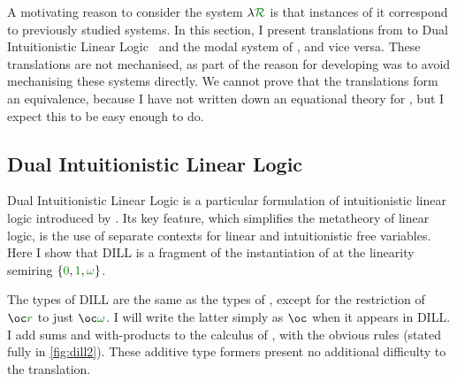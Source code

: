 \newcommand\instDILL{\gr{01\omega}}
\newcommand\instPD{\gr{01\Box}}

\newcommand\unused{\gr0}
\newcommand\true{\gr1}
\newcommand\valid{\gr\Box}

A motivating reason to consider the system $\name$ is that
instances of it correspond to previously studied systems.
In this section, I present translations from \name{} to Dual Intuitionistic
Linear Logic~\citep{Barber1996} and the modal system of \citet{judgmental},
and vice versa.
These translations are not mechanised, as part of the reason for developing
\name{} was to avoid mechanising these systems directly.
We cannot prove that the translations form an equivalence, because I have not
written down an equational theory for \name{}, but I expect this to be easy
enough to do.

\subsection{Dual Intuitionistic Linear Logic}\label{sec:trans-dill}

Dual Intuitionistic Linear Logic is a particular formulation of intuitionistic
linear logic introduced by \citet{Barber1996}.
Its key feature, which simplifies the metatheory of linear logic, is the use of
separate contexts for linear and intuitionistic free variables.
Here I show that DILL is a fragment of the instantiation of \name{} at the
linearity semiring $\{\gr0, \gr1, \gr\omega\}$.

The types of DILL are the same as the types of \name, except for the
restriction of $\oc\gr{r}$ to just $\oc\gr\omega$.
I will write the latter simply as $\oc$ when it appears in DILL\@.
I add sums and with-products to the calculus of \citet{Barber1996}, with the
obvious rules (stated fully in \cref{fig:dill2}).
These additive type formers present no additional difficulty to the translation.

